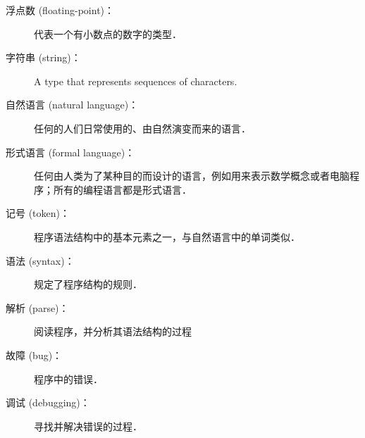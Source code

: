 \begin{description}
\item[浮点数 (floating-point)：] 代表一个有小数点的数字的类型．
  


\item[字符串 (string)：] A type that represents sequences of characters.
  


\item[自然语言 (natural language)：]  任何的人们日常使用的、由自然演变而来的语言．
  


\item[形式语言 (formal language)：]  任何由人类为了某种目的而设计的语言，例如用来表示数学概念或者电脑程序；所有的编程语言都是形式语言．
  


\item[记号 (token)：]  程序语法结构中的基本元素之一，与自然语言中的单词类似．
  


\item[语法 (syntax)：] 规定了程序结构的规则．
  


\item[解析 (parse)：] 阅读程序，并分析其语法结构的过程


\item[故障 (bug)：] 程序中的错误．


\item[调试 (debugging)：] 寻找并解决错误的过程．
  

\end{description}

